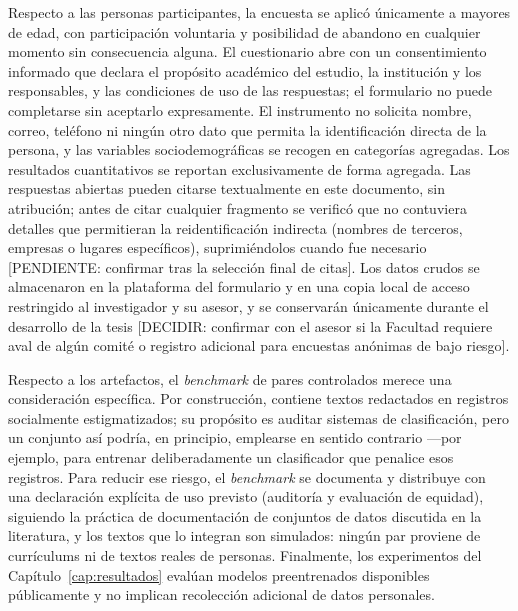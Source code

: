 Respecto a las personas participantes, la encuesta se aplicó únicamente a
mayores de edad, con participación voluntaria y posibilidad de abandono en
cualquier momento sin consecuencia alguna. El cuestionario abre con un
consentimiento informado que declara el propósito académico del estudio, la
institución y los responsables, y las condiciones de uso de las respuestas; el
formulario no puede completarse sin aceptarlo expresamente. El instrumento no
solicita nombre, correo, teléfono ni ningún otro dato que permita la
identificación directa de la persona, y las variables sociodemográficas se
recogen en categorías agregadas. Los resultados cuantitativos se reportan
exclusivamente de forma agregada. Las respuestas abiertas pueden citarse
textualmente en este documento, sin atribución; antes de citar cualquier
fragmento se verificó que no contuviera detalles que permitieran la
reidentificación indirecta (nombres de terceros, empresas o lugares
específicos), suprimiéndolos cuando fue necesario
[PENDIENTE: confirmar tras la selección final de citas]. Los datos crudos se
almacenaron en la plataforma del formulario y en una copia local de acceso
restringido al investigador y su asesor, y se conservarán únicamente durante
el desarrollo de la tesis [DECIDIR: confirmar con el asesor si la Facultad
requiere aval de algún comité o registro adicional para encuestas anónimas de
bajo riesgo].

Respecto a los artefactos, el \emph{benchmark} de pares controlados merece una
consideración específica. Por construcción, contiene textos redactados en
registros socialmente estigmatizados; su propósito es auditar sistemas de
clasificación, pero un conjunto así podría, en principio, emplearse en sentido
contrario ---por ejemplo, para entrenar deliberadamente un clasificador que
penalice esos registros. Para reducir ese riesgo, el \emph{benchmark} se
documenta y distribuye con una declaración explícita de uso previsto
(auditoría y evaluación de equidad), siguiendo la práctica de documentación de
conjuntos de datos discutida en la literatura, y los textos que lo integran
son simulados: ningún par proviene de currículums ni de textos reales de
personas. Finalmente, los experimentos del Capítulo~\ref{cap:resultados}
evalúan modelos preentrenados disponibles públicamente y no implican
recolección adicional de datos personales.
